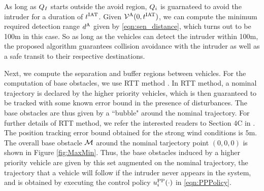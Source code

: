As long as $Q_{I}$ starts outside the avoid region, $Q_i$ is guarnateed to avoid the intruder for a duration of $t^\text{IAT}$. Given $\mathcal{V}^{\text{A}}(0, t^\text{IAT})$, we can compute the minimum required detection range $d^\text{A}$ given by \eqref{eqn:sen_distance}, which turns out to be 100m in this case. So as long as the vehicles can detect the intruder within 100m, the proposed algorithm guarantees collision avoidance with the intruder as well as a safe transit to their respective destinations.   

Next, we compute the separation and buffer regions between vehicles. For the computation of base obstacles, we use RTT method \cite{Bansal2017}. In RTT method, a nominal trajectory is declared by the higher priority vehicles, which is then guaranteed to be tracked with some known error bound in the presence of disturbances. The base obstacles are thus given by a ``bubble" around the nominal trajectory. For further details of RTT method, we refer the interested readers to Section 4C in \cite{Bansal2017}. The position tracking error bound obtained for the strong wind conditions is $5$m. The overall base obstacle $\mathcal{M}$ around the nominal tarjectory point $(0, 0, 0)$ is shown in Figure \ref{fig:MaxMin}. Thus, the base obstacles induced by a higher priority vehicle are given by this set augmented on the nominal trajectory, the trajectory that a vehicle will follow if the intruder never appears in the system, and is obtained by executing the control policy ${u^{\text{PP}}_{i}}(\cdot)$ in \eqref{eqn:PPPolicy}.

